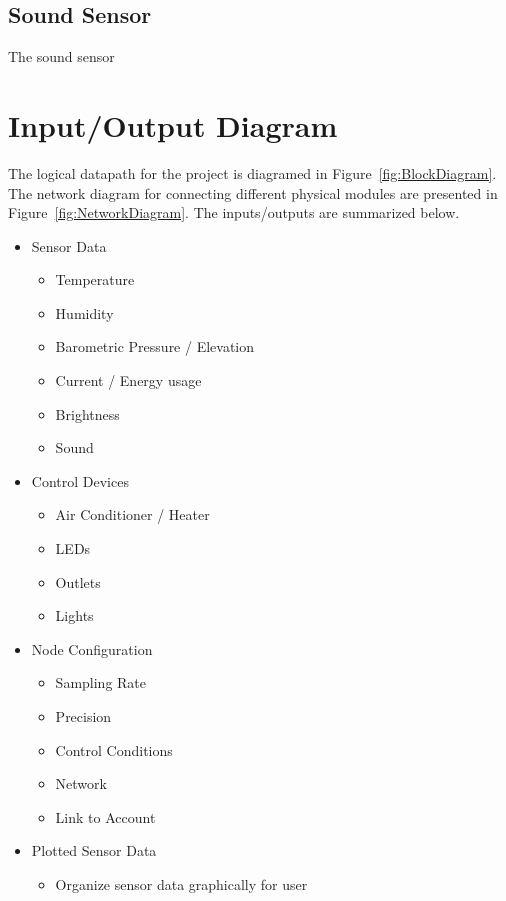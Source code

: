 		\subsection{Sound Sensor}
			The sound sensor %
		
	 \section{Input/Output Diagram}
		 The logical datapath for the project is diagramed in Figure~\ref{fig:BlockDiagram}. The network diagram for connecting different physical modules are presented in Figure~\ref{fig:NetworkDiagram}. The inputs/outputs are summarized below.
		 \begin{itemize}
		 	\item Sensor Data
		 	\begin{itemize}
		 		\item Temperature
		 		\item Humidity
		 		\item Barometric Pressure / Elevation
		 		\item Current / Energy usage
		 		\item Brightness
		 		\item Sound
		 	\end{itemize}
		 	\item Control Devices
		 	\begin{itemize}
		 		\item Air Conditioner / Heater
		 		\item LEDs
		 		\item Outlets
		 		\item Lights
		 	\end{itemize}
		 	\item Node Configuration
		 	\begin{itemize}
		 		\item Sampling Rate
		 		\item Precision
		 		\item Control Conditions
		 		\item Network
		 		\item Link to Account
		 	\end{itemize}
		 	\item Plotted Sensor Data
		 	\begin{itemize}
		 		\item Organize sensor data graphically for user

\end{itemize}
\end{itemize}
